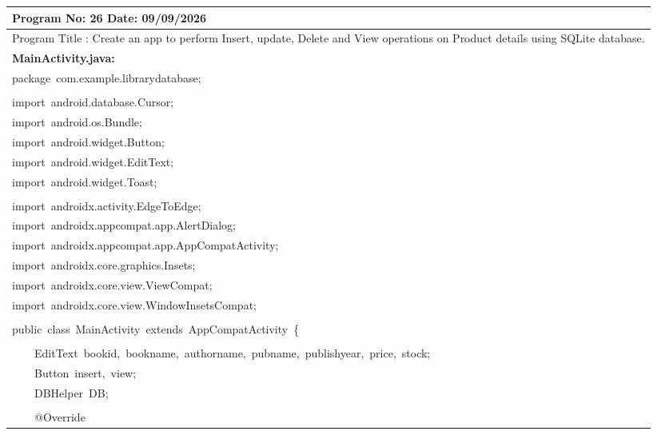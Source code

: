 \documentclass[a4paper,12pt]{article}
\begin{document}
\noindent\begingroup
\renewcommand{\arraystretch}{1.1}
\begin{longtable}{|p{}|}
\hline\endfirsthead\hline\endhead\hline\endfoot\hline\endlastfoot
\rule{0pt}{13pt}Program No: 26 \hfill Date: 09/09/2026 \\
\hline
\rule{0pt}{13pt}Program Title : Create an app to perform Insert, update, Delete and View operations on Product details using SQLite database. \\
\hline
\rule{0pt}{13pt}\textbf{MainActivity.java:} \\
\hline
{\ttfamily\small package\ com.example.librarydatabase;} \\
\strut \\
{\ttfamily\small import\ android.database.Cursor;} \\
{\ttfamily\small import\ android.os.Bundle;} \\
{\ttfamily\small import\ android.widget.Button;} \\
{\ttfamily\small import\ android.widget.EditText;} \\
{\ttfamily\small import\ android.widget.Toast;} \\
\strut \\
{\ttfamily\small import\ androidx.activity.EdgeToEdge;} \\
{\ttfamily\small import\ androidx.appcompat.app.AlertDialog;} \\
{\ttfamily\small import\ androidx.appcompat.app.AppCompatActivity;} \\
{\ttfamily\small import\ androidx.core.graphics.Insets;} \\
{\ttfamily\small import\ androidx.core.view.ViewCompat;} \\
{\ttfamily\small import\ androidx.core.view.WindowInsetsCompat;} \\
\strut \\
{\ttfamily\small public\ class\ MainActivity\ extends\ AppCompatActivity\ \{} \\
\strut \\
{\ttfamily\small \ \ \ \ EditText\ bookid,\ bookname,\ authorname,\ pubname,\ publishyear,\ price,\ stock;} \\
{\ttfamily\small \ \ \ \ Button\ insert,\ view;} \\
{\ttfamily\small \ \ \ \ DBHelper\ DB;} \\
\strut \\
{\ttfamily\small \ \ \ \ @Override} \\

\end{longtable}
\end{document}
